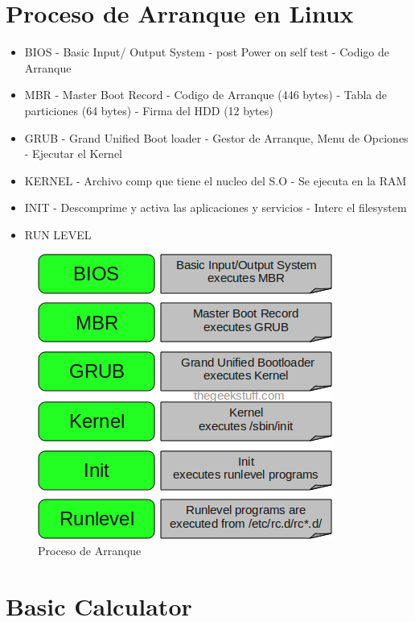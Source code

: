 \documentclass[11pt,twoside]{book}
\begin{document}
\section{Proceso de Arranque en Linux}

\begin{itemize}
\item BIOS  -  Basic Input/ Output System - post Power on self test - Codigo de Arranque
\item MBR -  Master Boot Record - Codigo de Arranque (446 bytes) - Tabla de particiones (64 bytes)  - Firma del HDD (12 bytes)
\item GRUB - Grand Unified Boot loader - Gestor de Arranque, Menu de Opciones - Ejecutar el Kernel
\item KERNEL - Archivo comp que tiene el nucleo del S.O - Se ejecuta en la RAM 
\item INIT - Descomprime y activa las aplicaciones y servicios - Interc el filesystem 
\item RUN LEVEL 

\end{itemize}

\begin{figure}
    \centering
    \includegraphics[width=0.5\linewidth]{PAL.png}
    \caption{Proceso de Arranque}
\end{figure}

\section{Basic Calculator}
\end{document}
